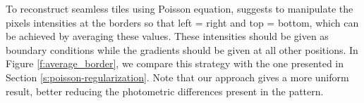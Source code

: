



To reconstruct seamless tiles using Poisson equation, \citet{perez2023poisson} suggests to manipulate the pixels intensities at the borders so that left = right and top = bottom, which can be achieved by averaging these values. These intensities should be given as boundary conditions while the gradients should be given at all other positions. In Figure \ref{f:average_border},  we compare this strategy with the one presented in Section \ref{s:poisson-regularization}. Note that our approach gives a more uniform result, better reducing the photometric differences present in the pattern.

